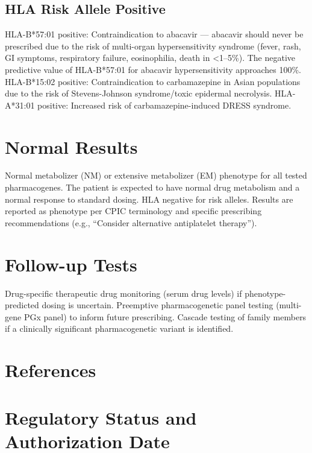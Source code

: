 \subsection*{HLA Risk Allele Positive}
HLA-B*57:01 positive: Contraindication to abacavir --- abacavir should never be prescribed due to the risk of multi-organ hypersensitivity syndrome (fever, rash, GI symptoms, respiratory failure, eosinophilia, death in <1--5\%). The negative predictive value of HLA-B*57:01 for abacavir hypersensitivity approaches 100\%. HLA-B*15:02 positive: Contraindication to carbamazepine in Asian populations due to the risk of Stevens-Johnson syndrome/toxic epidermal necrolysis. HLA-A*31:01 positive: Increased risk of carbamazepine-induced DRESS syndrome.

\section*{Normal Results}
Normal metabolizer (NM) or extensive metabolizer (EM) phenotype for all tested pharmacogenes. The patient is expected to have normal drug metabolism and a normal response to standard dosing. HLA negative for risk alleles. Results are reported as phenotype per CPIC terminology and specific prescribing recommendations (e.g., ``Consider alternative antiplatelet therapy'').

\section*{Follow-up Tests}
Drug-specific therapeutic drug monitoring (serum drug levels) if phenotype-predicted dosing is uncertain. Preemptive pharmacogenetic panel testing (multi-gene PGx panel) to inform future prescribing. Cascade testing of family members if a clinically significant pharmacogenetic variant is identified.

\section*{References}



\clearpage
\section*{Regulatory Status and Authorization Date}

\clearpage
